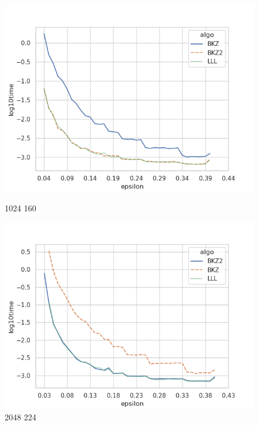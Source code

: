 \documentclass{backend}
\begin{document}
\begin{figure}[H]
    \centering
    \begin{minipage}{0.45\textwidth}
        \centering
        \includegraphics[width=\textwidth]{img/contigu/1024_160_mint_maxm_epsi_time_log.png}
        \caption{1024 160}
        \label{fig:1024 160}
    \end{minipage}
    \hfill
    \begin{minipage}{0.45\textwidth}
        \centering
        \includegraphics[width=\textwidth]{img/contigu/2048_224_mint_maxm_epsi_time_log.png}
        \caption{2048 224}
        \label{fig:image2}
    \end{minipage}
    \vfill
    \begin{minipage}{0.45\textwidth}

\end{minipage}
\end{figure}
\end{document}
